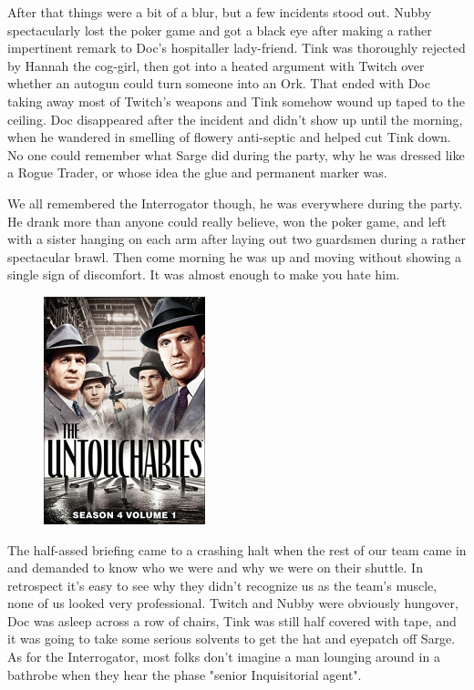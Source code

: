 After that things were a bit of a blur, but a few incidents stood out. 
Nubby spectacularly lost the poker game and got a black eye after making a rather impertinent remark to Doc's hospitaller lady-friend. 
Tink was thoroughly rejected by Hannah the cog-girl, then got into a heated argument with Twitch over whether an autogun could turn someone into an Ork. 
That ended with Doc taking away most of Twitch's weapons and Tink somehow wound up taped to the ceiling. 
Doc disappeared after the incident and didn't show up until the morning, when he wandered in smelling of flowery anti-septic and helped cut Tink down. 
No one could remember what Sarge did during the party, why he was dressed like a Rogue Trader, or whose idea the glue and permanent marker was.

We all remembered the Interrogator though, he was everywhere during the party. 
He drank more than anyone could really believe, won the poker game, and left with a sister hanging on each arm after laying out two guardsmen during a rather spectacular brawl. 
Then come morning he was up and moving without showing a single sign of discomfort. 
It was almost enough to make you hate him.

\begin{figure}
	\begin{center}
		\includegraphics[width=\figwidth]{pics/9/5.png}
	\end{center}
\end{figure}
The half-assed briefing came to a crashing halt when the rest of our team came in and demanded to know who we were and why we were on their shuttle. 
In retrospect it's easy to see why they didn't recognize us as the team's muscle, none of us looked very professional. 
Twitch and Nubby were obviously hungover, Doc was asleep across a row of chairs, Tink was still half covered with tape, and it was going to take some serious solvents to get the hat and eyepatch off Sarge. 
As for the Interrogator, most folks don't imagine a man lounging around in a bathrobe when they hear the phase "senior Inquisitorial agent".

